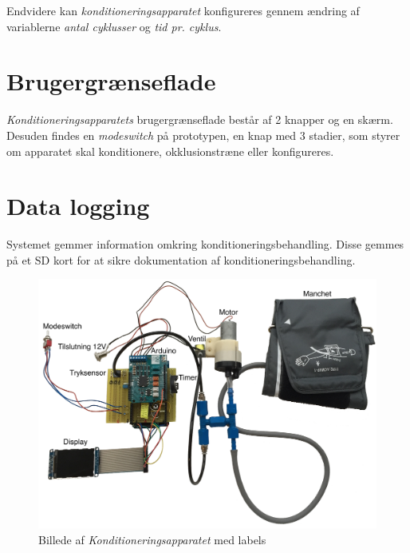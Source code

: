 Endvidere kan \textit{konditioneringsapparatet} konfigureres gennem ændring af variablerne \textit{antal cyklusser} og \textit{tid pr. cyklus}.


\section{Brugergrænseflade}
\textit{Konditioneringsapparatets} brugergrænseflade består af 2 knapper og en skærm. Desuden findes en \textit{modeswitch} på prototypen, en knap med 3 stadier, som styrer om apparatet skal konditionere, okklusionstræne eller konfigureres.  

\section{Data logging}
Systemet gemmer information omkring konditioneringsbehandling. Disse gemmes på et SD kort for at sikre dokumentation af konditioneringsbehandling.

\begin{figure}[H]
	\centering
	\includegraphics[width = \textwidth]{billeder/Konditioneringsapparat-tekst.png}
	\caption{Billede af \textit{Konditioneringsapparatet} med labels} \label{fig:oversigtsbillede}
\end{figure}